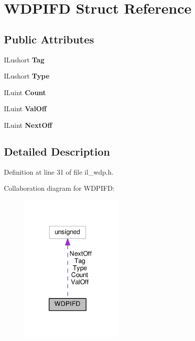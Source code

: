 \hypertarget{structWDPIFD}{}\section{W\+D\+P\+I\+FD Struct Reference}
\label{structWDPIFD}
\subsection*{Public Attributes}
\begin{DoxyCompactItemize}
\item 
\mbox{\label{structWDPIFD_ae6b099b71e102dfd2d3409116ce0df50}} 
I\+Lushort {\bfseries Tag}
\item 
\mbox{\label{structWDPIFD_a45c0cf4701df58cf1196a968ed492220}} 
I\+Lushort {\bfseries Type}
\item 
\mbox{\label{structWDPIFD_a75bedfe1d4e14fbe186ce07ec0d20448}} 
I\+Luint {\bfseries Count}
\item 
\mbox{\label{structWDPIFD_a6705e9f8432f1f34f299a106245212a5}} 
I\+Luint {\bfseries Val\+Off}
\item 
\mbox{\label{structWDPIFD_a104bc9469c9157c1e2590f9f76305e6e}} 
I\+Luint {\bfseries Next\+Off}
\end{DoxyCompactItemize}


\subsection{Detailed Description}


Definition at line 31 of file il\+\_\+wdp.\+h.



Collaboration diagram for W\+D\+P\+I\+FD\+:
\nopagebreak
\begin{figure}[H]
\begin{center}
\leavevmode
\includegraphics[width=147pt]{d4/dac/structWDPIFD__coll__graph}
\end{center}
\end{figure}


